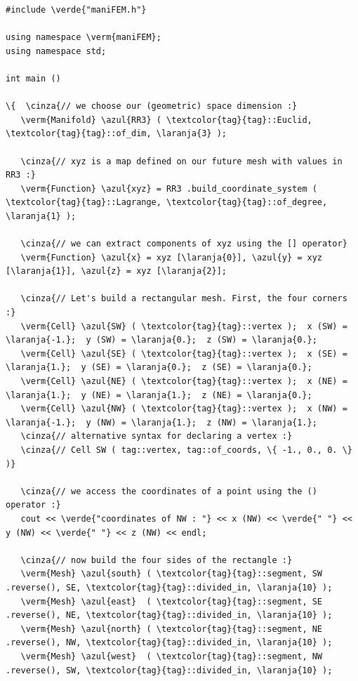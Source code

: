 \begin{Verbatim}[commandchars=\\\{\},formatcom=\small\tt,frame=single,
   label=parag-\ref{\numb section 1.\numb parag 1}.cpp,rulecolor=\color{moldura},
   baselinestretch=0.94,framesep=2mm                                            ]
#include \verde{"maniFEM.h"}

using namespace \verm{maniFEM};
using namespace std;

int main ()

\{  \cinza{// we choose our (geometric) space dimension :}
   \verm{Manifold} \azul{RR3} ( \textcolor{tag}{tag}::Euclid, \textcolor{tag}{tag}::of_dim, \laranja{3} );
   
   \cinza{// xyz is a map defined on our future mesh with values in RR3 :}
   \verm{Function} \azul{xyz} = RR3 .build_coordinate_system ( \textcolor{tag}{tag}::Lagrange, \textcolor{tag}{tag}::of_degree, \laranja{1} );

   \cinza{// we can extract components of xyz using the [] operator}
   \verm{Function} \azul{x} = xyz [\laranja{0}], \azul{y} = xyz [\laranja{1}], \azul{z} = xyz [\laranja{2}];

   \cinza{// Let's build a rectangular mesh. First, the four corners :}
   \verm{Cell} \azul{SW} ( \textcolor{tag}{tag}::vertex );  x (SW) = \laranja{-1.};  y (SW) = \laranja{0.};  z (SW) = \laranja{0.};
   \verm{Cell} \azul{SE} ( \textcolor{tag}{tag}::vertex );  x (SE) =  \laranja{1.};  y (SE) = \laranja{0.};  z (SE) = \laranja{0.};
   \verm{Cell} \azul{NE} ( \textcolor{tag}{tag}::vertex );  x (NE) =  \laranja{1.};  y (NE) = \laranja{1.};  z (NE) = \laranja{0.};
   \verm{Cell} \azul{NW} ( \textcolor{tag}{tag}::vertex );  x (NW) = \laranja{-1.};  y (NW) = \laranja{1.};  z (NW) = \laranja{1.};
   \cinza{// alternative syntax for declaring a vertex :}
   \cinza{// Cell SW ( tag::vertex, tag::of_coords, \{ -1., 0., 0. \} )}
   
   \cinza{// we access the coordinates of a point using the () operator :}
   cout << \verde{"coordinates of NW : "} << x (NW) << \verde{" "} << y (NW) << \verde{" "} << z (NW) << endl;

   \cinza{// now build the four sides of the rectangle :}
   \verm{Mesh} \azul{south} ( \textcolor{tag}{tag}::segment, SW .reverse(), SE, \textcolor{tag}{tag}::divided_in, \laranja{10} );
   \verm{Mesh} \azul{east}  ( \textcolor{tag}{tag}::segment, SE .reverse(), NE, \textcolor{tag}{tag}::divided_in, \laranja{10} );
   \verm{Mesh} \azul{north} ( \textcolor{tag}{tag}::segment, NE .reverse(), NW, \textcolor{tag}{tag}::divided_in, \laranja{10} );
   \verm{Mesh} \azul{west}  ( \textcolor{tag}{tag}::segment, NW .reverse(), SW, \textcolor{tag}{tag}::divided_in, \laranja{10} );
   

\end{Verbatim}
